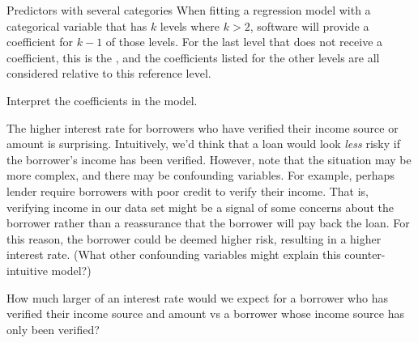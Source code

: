 \begin{onebox}{Predictors with several categories}
When fitting a regression model with a categorical variable
that has $k$ levels where $k > 2$, software will provide
a coefficient for $k - 1$ of those levels.
For the last level that does not receive a coefficient,
this is the , and the coefficients
listed for the other levels are all considered relative
to this reference level.
\end{onebox}

\begin{exercisewrap}
\begin{nexercise}
Interpret the coefficients in the 
model.\footnotemark
\end{nexercise}
\end{exercisewrap}

The higher interest rate for borrowers who have verified
their income source or amount is surprising.
Intuitively, we'd think that a loan would look \emph{less}
risky if the borrower's income has been verified.
However, note that the situation may be more complex,
and there may be confounding variables.
For example, perhaps lender require borrowers with
poor credit to verify their income.
That is, verifying income in our data set might be
a signal of some concerns about the borrower
rather than a reassurance that the borrower will pay
back the loan.
For this reason, the borrower could be deemed higher
risk, resulting in a higher interest rate.
(What other confounding variables might explain this
counter-intuitive model?)

\begin{exercisewrap}
\begin{nexercise}
How much larger of an interest rate would we expect for
a borrower who has verified their income source and amount
vs a borrower whose income source has only been
verified?\footnotemark
\end{nexercise}
\end{exercisewrap}


